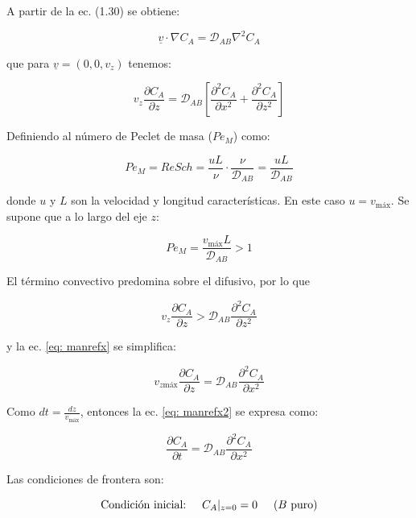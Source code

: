 A partir de la ec. (1.30) se obtiene:

$$	\underline{v} \cdot \nabla C_A = \mathcal{D}_{AB} \nabla^2 C_A $$

que para $\underline{v} = (0, 0, v_z)$ tenemos:

\begin{equation} \label{eq: manrefx}
	v_z \frac{\partial C_A}{\partial z} = \mathcal{D}_{AB} \left[ \frac{\partial^2 C_A}{\partial x^2} + \frac{\partial^2 C_A}{\partial z^2}  \right]
\end{equation}

Definiendo al número de Peclet de masa ($Pe_M$) como: 

\begin{equation}
	Pe_M = Re Sch = \frac{uL}{\nu} \cdot \frac{\nu}{\mathcal{D}_{AB}} = \frac{uL}{\mathcal{D}_{AB}}
\end{equation}

donde $u$ y $L$ son la velocidad y longitud características. En este caso $u = v_{\text{máx}}$. Se supone que a lo largo del eje $z$:

$$Pe_M = \frac{v_{\text{máx}} L}{\mathcal{D}_{AB}} > 1$$

El término convectivo predomina sobre el difusivo, por lo que

$$v_z \frac{\partial C_A}{\partial z} > \mathcal{D}_{AB} \frac{\partial^2 C_A}{\partial z^2}$$

y la ec. \eqref{eq: manrefx} se simplifica:

\begin{equation} \label{eq: manrefx2}
v_{z \text{máx}} \frac{\partial C_A}{\partial z} = \mathcal{D}_{AB} \frac{\partial^2 C_A}{\partial x^2}
\end{equation}

Como $dt = \frac{dz}{v_{\text{máx}}}$, entonces la ec. \eqref{eq: manrefx2} se expresa como:

\begin{equation} \label{eq: manrefx3}
	\frac{\partial C_A}{\partial t} = \mathcal{D}_{AB} \frac{\partial^2 C_A}{\partial x^2}
\end{equation}

Las condiciones de frontera son:

\begin{equation}
	\text{Condición inicial:} \hspace{0.5cm} C_A|_{z=0} = 0 \hspace{0.5cm} \text{($B$ puro)}
\end{equation}

